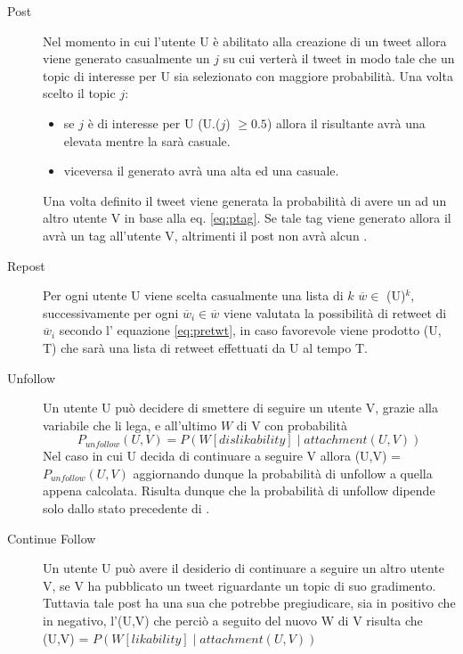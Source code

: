 \begin{description}

  \item[Post] Nel momento in cui l'utente U \`e abilitato alla 
  creazione di un tweet allora viene generato casualmente un 
  \topic{} $j$ su cui verter\`a il tweet in modo tale che un topic 
  di interesse per U sia selezionato con maggiore probabilit\`a.
  Una volta scelto il topic $j$:
  \begin{itemize}
    \item se $j$ \`e di interesse per U (U.\PI{}($j$) $\geq 0.5$)
     allora il \twt{} risultante
    avr\`a una \lika{} elevata mentre la \disla{} sar\`a casuale.
    \item viceversa il \twt{} generato avr\`a una \disla{} alta ed
    una \lika{} casuale.
  \end{itemize}
  Una volta definito il tweet viene generata la probabilit\`a di 
  avere un \dtag{} ad un altro utente V in base alla eq. 
  \ref{eq:ptag}. Se tale tag viene generato allora il \twt{} avr\`a
  un tag all'utente V, altrimenti il post non avr\`a alcun \dtag{}.
  
  \item[Repost] Per ogni utente U viene scelta casualmente una lista 
  di $k$ \twt{} $\overline{w} \in$ \FOV{}(U)$^k$, successivamente
  per ogni $\overline{w}_i \in \overline{w}$ viene valutata la 
  possibilit\`a di retweet di $\overline{w}_i$ secondo l' equazione
  \ref{eq:pretwt}, in caso favorevole viene prodotto \retwt{}(U, T) 
  che sar\`a una lista di retweet effettuati da U al tempo T.
  \item[Unfollow] Un utente U pu\`o decidere di smettere di seguire 
  un utente V, grazie alla variabile \attach{} che li lega, e 
  all'ultimo \twt{} $W$ di V con probabilit\`a 
  \begin{equation*}
    P_{unfollow}(U, V) = P(W[dislikability] \mid attachment(U, V))
  \end{equation*}
  Nel caso in cui U decida di continuare a seguire V allora 
  \attach{}(U,V) = $P_{unfollow}(U, V)$ aggiornando dunque la
  probabilit\`a di unfollow a quella appena calcolata.
  Risulta dunque che la probabilit\`a di unfollow dipende solo dallo 
  stato precedente di \attach{}.
    
  \item[Continue Follow] Un utente U pu\`o avere il desiderio di 
  continuare a seguire un altro utente V, se V ha pubblicato un tweet
  riguardante un topic di suo gradimento. Tuttavia tale post ha una
  sua \lika{} che potrebbe pregiudicare, sia in positivo che in 
  negativo, l'\attach{}(U,V) che perci\`o a seguito del nuovo \twt{} 
  W di V risulta che
  \attach{}(U,V) = $P(W[likability] \mid attachment(U,V))$
  

\end{description}
